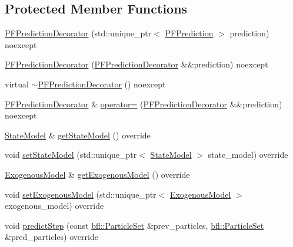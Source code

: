 \subsection*{Protected Member Functions}
\begin{DoxyCompactItemize}
\item 
\mbox{\hyperlink{classbfl_1_1PFPredictionDecorator_ab2b0e6cdba28a84750be81633a1a0d17}{P\+F\+Prediction\+Decorator}} (std\+::unique\+\_\+ptr$<$ \mbox{\hyperlink{classbfl_1_1PFPrediction}{P\+F\+Prediction}} $>$ prediction) noexcept
\item 
\mbox{\hyperlink{classbfl_1_1PFPredictionDecorator_a1d89c07579cf675ad4850716445e165e}{P\+F\+Prediction\+Decorator}} (\mbox{\hyperlink{classbfl_1_1PFPredictionDecorator}{P\+F\+Prediction\+Decorator}} \&\&prediction) noexcept
\item 
virtual \mbox{\hyperlink{classbfl_1_1PFPredictionDecorator_ae811b419d4ca5961f7e91528ffd44b3b}{$\sim$\+P\+F\+Prediction\+Decorator}} () noexcept
\item 
\mbox{\hyperlink{classbfl_1_1PFPredictionDecorator}{P\+F\+Prediction\+Decorator}} \& \mbox{\hyperlink{classbfl_1_1PFPredictionDecorator_ac5dcaf62987b0cd48f568373dcd71655}{operator=}} (\mbox{\hyperlink{classbfl_1_1PFPredictionDecorator}{P\+F\+Prediction\+Decorator}} \&\&prediction) noexcept
\item 
\mbox{\hyperlink{classbfl_1_1StateModel}{State\+Model}} \& \mbox{\hyperlink{classbfl_1_1PFPredictionDecorator_afad4d92333c84f909c41bd589b839113}{get\+State\+Model}} () override
\item 
void \mbox{\hyperlink{classbfl_1_1PFPredictionDecorator_ad269dfbdecf19d67717a8bc44f0bd286}{set\+State\+Model}} (std\+::unique\+\_\+ptr$<$ \mbox{\hyperlink{classbfl_1_1StateModel}{State\+Model}} $>$ state\+\_\+model) override
\item 
\mbox{\hyperlink{classbfl_1_1ExogenousModel}{Exogenous\+Model}} \& \mbox{\hyperlink{classbfl_1_1PFPredictionDecorator_a8d25d3765f642f7de1af897d088d8da9}{get\+Exogenous\+Model}} () override
\item 
void \mbox{\hyperlink{classbfl_1_1PFPredictionDecorator_a3c38ae386456ecd0fd1b609b381395ec}{set\+Exogenous\+Model}} (std\+::unique\+\_\+ptr$<$ \mbox{\hyperlink{classbfl_1_1ExogenousModel}{Exogenous\+Model}} $>$ exogenous\+\_\+model) override
\item 
void \mbox{\hyperlink{classbfl_1_1PFPredictionDecorator_a570bd3a338034e65c1fa5abee429e717}{predict\+Step}} (const \mbox{\hyperlink{classbfl_1_1ParticleSet}{bfl\+::\+Particle\+Set}} \&prev\+\_\+particles, \mbox{\hyperlink{classbfl_1_1ParticleSet}{bfl\+::\+Particle\+Set}} \&pred\+\_\+particles) override
\end{DoxyCompactItemize}
